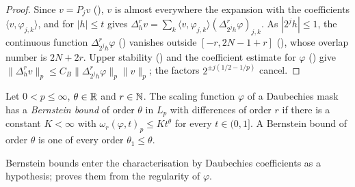 \begin{proof}
\leanok
{}
Since $v = P_j v$ (), $v$ is almost everywhere the expansion with
the coefficients $\langle v, \varphi_{j,k} \rangle$, and for $|h| \leq t$
 gives
$\Delta_h^r v = \sum_k \langle v, \varphi_{j,k} \rangle (\Delta_{2^j h}^r \varphi)_{j,k}$. As
$|2^j h| \leq 1$, the continuous function $\Delta_{2^j h}^r \varphi$
() vanishes outside $[-r, 2N - 1 + r]$
(), whose overlap number is $2N + 2r$. Upper stability
() and the coefficient estimate for $\varphi$
() give
$\|\Delta_h^r v\|_p \leq C_B \|\Delta_{2^j h}^r \varphi\|_p \|v\|_p$; the factors
$2^{\pm j(1/2 - 1/p)}$ cancel.
\end{proof}

\begin{definition}
\label{def:daub-bernstein-bound}
\leanok
{}
Let $0 < p \leq \infty$, $\theta \in \mathbb{R}$ and $r \in \mathbb{N}$. The scaling function $\varphi$ of a
Daubechies mask has a \emph{Bernstein bound} of order $\theta$ in $L_p$ with differences of order
$r$ if there is a constant $K < \infty$ with $\omega_r(\varphi, t)_p \leq K t^\theta$ for every
$t \in (0, 1]$. A Bernstein bound of order $\theta$ is one of every order $\theta_1 \leq \theta$.
\end{definition}

Bernstein bounds enter the characterisation by Daubechies coefficients as a hypothesis;
 proves them from the regularity of $\varphi$.

